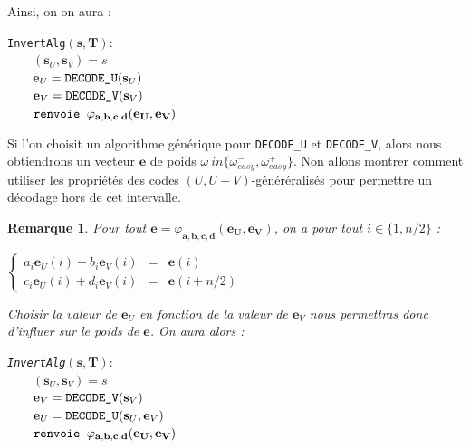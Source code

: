\documentclass[12pt]{article}
\theoremstyle{plain}
\newtheorem{remarque}[thm]{Remarque}
\begin{document}
Ainsi, on on aura : \\
\begin{flushleft}
\leftskip=2cm
\verb|InvertAlg|$(\mathbf{s},\mathbf{T}) : $\\
$\qquad (\mathbf{s}_U, \mathbf{s}_V) = s $\\
$\qquad \mathbf{e}_U = \verb|DECODE_U|(\mathbf{s}_U) $\\
$\qquad \mathbf{e}_V = \verb|DECODE_V|(\mathbf{s}_V)$ \\
$\qquad \verb|renvoie | \varphi_{\mathbf{a},\mathbf{b},\mathbf{c},\mathbf{d}}(\mathbf{e_U},\mathbf{e_V})$ \\
\leftskip=0cm
\vspace{0.1in}

\end{flushleft}
Si l'on choisit un algorithme générique pour \verb|DECODE_U| et \verb|DECODE_V|, alors nous obtiendrons un vecteur $\mathbf{e}$ de poids $\omega \ in \{\omega_{easy}^-,\omega_{easy}^+\}$. Non allons montrer comment utiliser les propriétés des codes $(U,U+V)$-généréralisés pour permettre un décodage hors de cet intervalle. 

\begin{remarque} Pour tout $\mathbf{e} = \varphi_{\mathbf{a},\mathbf{b},\mathbf{c},\mathbf{d}}(\mathbf{e_U},\mathbf{e_V})$, on a pour tout $i \in \{1,n/2\}$ :
\begin{center}

$\left \{
\begin{array}{rcl}
a_i\mathbf{e}_U(i) + b_i\mathbf{e}_V(i) &=& \mathbf{e}(i) \\
c_i\mathbf{e}_U(i) + d_i\mathbf{e}_V(i) &=& \mathbf{e}(i+n/2) 
\end{array}
\right.$
\end{center}

Choisir la valeur de $\mathbf{e}_U$ en fonction de la valeur de $\mathbf{e}_V$ nous permettras donc d'influer sur le poids de $\mathbf{e}$. On aura alors :

\begin{flushleft}
\leftskip=2cm
\verb|InvertAlg|$(\mathbf{s},\mathbf{T}) : $\\
$\qquad (\mathbf{s}_U, \mathbf{s}_V) = s $\\
$\qquad \mathbf{e}_V = \verb|DECODE_V|(\mathbf{s}_V)$ \\
$\qquad \mathbf{e}_U = \verb|DECODE_U|(\mathbf{s}_U, \mathbf{e}_V) $\\
$\qquad \verb|renvoie | \varphi_{\mathbf{a},\mathbf{b},\mathbf{c},\mathbf{d}}(\mathbf{e_U},\mathbf{e_V})$ \\
\leftskip=0cm
\vspace{0.1in}
\end{flushleft}

\end{remarque}
\end{document}
